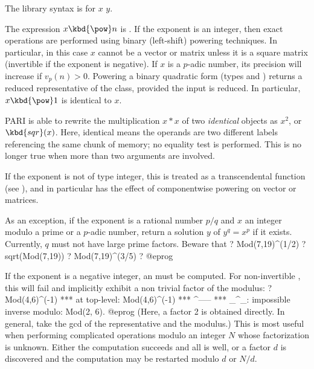 The library syntax is 
for $x$ \kbd{\%} $y$.

\subseckbd{\pow} The expression $x\hbox{\kbd{\pow}}n$ is .
If the exponent is an integer, then exact operations are performed using
binary (left-shift) powering techniques. In particular, in this case $x$
cannot be a vector or matrix unless it is a square matrix (invertible
if the exponent is negative). If $x$ is a $p$-adic number, its
precision will increase if $v_p(n) > 0$. Powering a binary quadratic form
(types  and ) returns a reduced representative of the
class, provided the input is reduced. In particular, $x\hbox{\kbd{\pow}}1$ is
identical to $x$.

PARI is able to rewrite the multiplication $x * x$ of two \emph{identical}
objects as $x^2$, or $\kbd{sqr}(x)$. Here, identical means the operands are
two different labels referencing the same chunk of memory; no equality test
is performed. This is no longer true when more than two arguments are
involved.

If the exponent is not of type integer, this is treated as a transcendental
function (see ), and in particular has the effect of
componentwise powering on vector or matrices.

As an exception, if the exponent is a rational number $p/q$ and $x$ an
integer modulo a prime or a $p$-adic number, return a solution $y$ of
$y^q=x^p$ if it exists. Currently, $q$ must not have large prime factors.
Beware that
\bprog
? Mod(7,19)^(1/2)
? sqrt(Mod(7,19))
? Mod(7,19)^(3/5)
? %
@eprog

If the exponent is a negative integer, an  must be computed.
For non-invertible , this will fail and implicitly exhibit a
non trivial factor of the modulus:
\bprog
? Mod(4,6)^(-1)
  ***   at top-level: Mod(4,6)^(-1)
  ***                         ^-----
  *** _^_: impossible inverse modulo: Mod(2, 6).
@eprog\noindent
(Here, a factor 2 is obtained directly. In general, take the gcd of the
representative and the modulus.) This is most useful when performing
complicated operations modulo an integer $N$ whose factorization is
unknown. Either the computation succeeds and all is well, or a factor $d$
is discovered and the computation may be restarted modulo $d$ or $N/d$.

